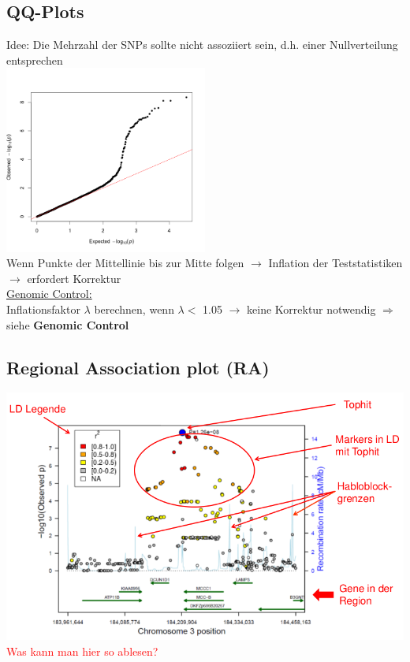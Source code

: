 \subsection{QQ-Plots}
Idee: Die Mehrzahl der SNPs sollte nicht assoziiert sein, d.h. einer Nullverteilung entsprechen\\
\includegraphics[width=0.5\textwidth]{lectures/V15/pix/qq_plot.png}\\
Wenn Punkte der Mittellinie bis zur Mitte folgen $\rightarrow$ Inflation der Teststatistiken
$\rightarrow$ erfordert Korrektur\\

\underline{Genomic Control:}\\
Inflationsfaktor $\lambda$ berechnen, wenn $\lambda <$ 1.05 $\rightarrow$ keine Korrektur notwendig $\Rightarrow$ siehe \textbf{Genomic Control}

\newpage
\subsection{Regional Association plot (RA)}
\includegraphics[width=1.0\textwidth]{lectures/V15/pix/ra_plot.png}\\
\textcolor{red}{Was kann man hier so ablesen?}


